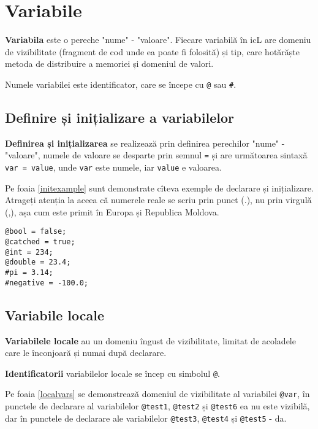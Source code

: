 \section{Variabile}

\textbf{Variabila} este o pereche "nume" - "valoare". Fiecare variabilă în icL are domeniu de vizibilitate (fragment de cod unde ea poate fi folosită) și tip, care hotărăște metoda de distribuire a memoriei și domeniul de valori.

Numele variabilei este identificator, care se începe cu \texttt{@} sau {\color{blue2}\texttt{#}}. 

\subsection{Definire și inițializare a variabilelor}

\textbf{Definirea și inițializarea} se realizează prin definirea perechilor "nume" - "valoare", numele de valoare se desparte prin semnul \texttt{=} și are următoarea sintaxă \texttt{var = value}, unde \texttt{var} este numele, iar \texttt{value} e valoarea.

Pe foaia \ref{initexample} sunt demonstrate cîteva exemple de declarare și inițializare. Atrageți atenția la aceea că numerele reale se scriu prin punct (.), nu prin virgulă (,), așa cum este primit în Europa și Republica Moldova.

\begin{sourcecode}
\label{initexample}
\begin{verbatim}
@bool = false;
@catched = true;
@int = 234;
@double = 23.4;
#pi = 3.14;
#negative = -100.0;
\end{verbatim}
\end{sourcecode}

\subsection{Variabile locale}

\textbf{Variabilele locale} au un domeniu îngust de vizibilitate, limitat de acoladele care le înconjoară și numai după declarare.

{\bf Identificatorii} variabilelor locale se încep cu simbolul \texttt{@}.

Pe foaia \ref{localvars} se demonstrează domeniul de vizibilitate al variabilei \texttt{@var}, în punctele de declarare al variabilelor \texttt{@test1}, \texttt{@test2} și \texttt{@test6} ea nu este vizibilă, dar în punctele de declarare ale variabilelor \texttt{@test3}, \texttt{@test4} și \texttt{@test5} - da.

